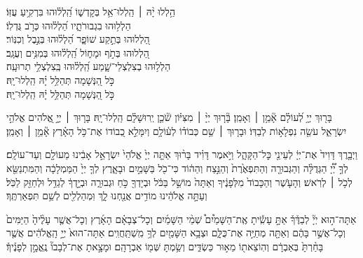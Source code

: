 \documentclass[twoside, openany, parskip=half, 11pt]{book}
\begin{document}
\begin{narrow}
 
הַ֥לְלוּ יָ֨הּ ׀ \hfill \break
 הַֽלְלוּ־אֵ֥ל בְּקָדְשׁ֑וֹ \hfill הַֽ֝לְל֗וּהוּ בִּרְקִ֥יעַ עֻזּֽוֹ׃ \\
 הַלְל֥וּהוּ בִגְבוּרֹתָ֑יו \hfill הַ֝לְל֗וּהוּ כְּרֹ֣ב גֻּדְלֽוֹ׃ \\
 הַ֭לְלוּהוּ בְּתֵ֣קַע שׁוֹפָ֑ר \hfill הַ֝לְל֗וּהוּ בְּנֵ֣בֶל וְכִנּֽוֹר׃ \\
 הַ֭לְלוּהוּ בְּתֹ֣ף וּמָח֑וֹל \hfill הַֽ֝לְל֗וּהוּ בְּמִנִּ֥ים וְעֻגָֽב׃ \\
 הַלְל֥וּהוּ בְצִלְצְלֵי־שָׁ֑מַע \hfill הַֽ֝לְל֗וּהוּ בְּֽצִלְצְלֵ֥י תְרוּעָֽה׃ \\
 כֹּ֣ל הַ֭נְּשָׁמָה תְּהַלֵּ֥ל יָ֗הּ \hfill הַֽלְלוּ־יָֽהּ׃ \\
\scriptsize{כֹּ֣ל הַ֭נְּשָׁמָה תְּהַלֵּ֥ל יָ֗הּ \hfill הַֽלְלוּ־יָֽהּ׃ \\}
\normalsize{}
 
\end{narrow} 



בָּר֖וּךְ
 יְיָ֥ לְ֝עוֹלָ֗ם אָ֘מֵ֥ן ׀ וְאָמֵֽן׃ 
בָּ֘ר֤וּךְ יְיָ֨ ׀ מִצִּיּ֗וֹן שֹׁ֘כֵ֤ן יְֽרוּשָׁלָ֗‍ִם הַֽלְלוּ־יָֽהּ׃ 
 בָּר֤וּךְ ׀ יְיָ֣ אֱ֭לֹהִים אֱלֹהֵ֣י יִשְׂרָאֵ֑ל עֹשֵׂ֖ה נִפְלָא֣וֹת לְבַדּֽוֹ׃ 
 וּבָר֤וּךְ ׀ שֵׁ֥ם כְּבוֹד֗וֹ לְע֫וֹלָ֥ם וְיִמָּלֵ֣א כְ֭בוֹדוֹ אֶת־כֹּ֥ל הָאָ֗רֶץ אָ֘מֵ֥ן ׀ וְאָמֵֽן׃ 
 




וַיְבָ֤רֶךְ
 דָּוִיד֙ אֶת־יְיָ֔ לְעֵינֵ֖י כׇּל־הַקָּהָ֑ל וַיֹּ֣אמֶר דָּוִ֗יד בָּר֨וּךְ אַתָּ֤ה יְיָ֙ אֱלֹהֵי֙ יִשְׂרָאֵ֣ל אָבִ֔ינוּ מֵעוֹלָ֖ם וְעַד־עוֹלָֽם׃ 
 לְךָ֣ יְ֠יָ֠ הַגְּדֻלָּ֨ה וְהַגְּבוּרָ֤ה וְהַתִּפְאֶ֙רֶת֙ וְהַנֵּ֣צַח וְהַה֔וֹד כִּי־כֹ֖ל בַּשָּׁמַ֣יִם וּבָאָ֑רֶץ לְךָ֤ יְיָ֙ הַמַּמְלָכָ֔ה וְהַמִּתְנַשֵּׂ֖א לְכֹ֥ל ׀ לְרֹֽאשׁ׃ 
 וְהָעֹ֤שֶׁר וְהַכָּבוֹד֙ מִלְּפָנֶ֔יךָ וְאַתָּה֙ מוֹשֵׁ֣ל בַּכֹּ֔ל וּבְיָדְךָ֖ כֹּ֣חַ וּגְבוּרָ֑ה וּבְיָ֣דְךָ֔ לְגַדֵּ֥ל וּלְחַזֵּ֖ק לַכֹּֽל׃ 
 וְעַתָּ֣ה אֱלֹהֵ֔ינוּ מוֹדִ֥ים אֲנַ֖חְנוּ לָ֑ךְ וּֽמְהַלְלִ֖ים לְשֵׁ֥ם תִּפְאַרְתֶּֽךָ׃ 



  אַתָּה־ה֣וּא
יְיָ֘ לְבַדֶּ֒ךָ֒ אַתָּ֣ עָשִֽׂ֡יתָ אֶֽת־הַשָּׁמַ֩יִם֩ שְׁמֵ֨י הַשָּׁמַ֜יִם וְכָל־צְבָאָ֗ם הָאָ֜רֶץ וְכָל־אֲשֶׁ֤ר עָלֶ֨יהָ֙ הַיַּמִּים֙ וְכָל־אֲשֶׁ֣ר בָּהֶ֔ם וְאַתָּ֖ה מְחַיֶּ֣ה אֶת־כֻּלָּ֑ם וּצְבָ֥א הַשָּׁמַ֖יִם לְךָ֥ מִֽשְׁתַּֽחֲוִֽים׃
 אַתָּה־הוּא֙ יְיָ֣ הָֽאֱלֹהִ֔ים אֲשֶׁ֤ר בָּחַ֨רְתָּ֙ בְּאַבְרָ֔ם וְהֽוֹצֵאת֖וֹ מֵא֣וּר כַּשְׂדִּ֑ים וְשַׂ֥מְתָּ שְּׁמ֖וֹ אַבְרָהָֽם׃ וּמָצָ֣אתָ אֶת־לְבָבוֹ֘ נֶֽאֱמָ֣ן לְפָנֶ֒יךָ֒׃
\end{document}
